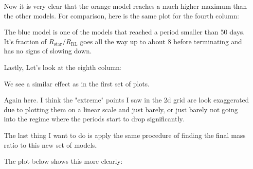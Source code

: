 \documentclass[a4paper,10pt]{article}
\begin{document}
Now it is very clear that the orange model reaches a much higher maximum than the other models. For comparison, here is the same plot for the fourth column:

\begin{figure}[ht]
    \centering
\end{figure}

The blue model is one of the models that reached a period smaller than 50 days. It's fraction of \(R_\text{star}/R_\text{RL}\) goes all the way up to about 8 before terminating and has no signs of slowing down.

\nextpage
Lastly, Let's look at the eighth column:

\begin{figure}[ht]
    \centering
\end{figure}

We see a similar effect as in the first set of plots.

\begin{figure}[ht]
    \centering
\end{figure}

Again here. I think the "extreme" points I saw in the 2d grid are look exaggerated due to plotting them on a linear scale and just barely, or just barely not going into the regime where the periods start to drop significantly.

The last thing I want to do is apply the same procedure of finding the final mass ratio to this new set of models.

\begin{figure}[ht]
    \centering
\end{figure}

The plot below shows this more clearly:
\begin{figure}[ht]
    \centering
\end{figure}

\begin{figure}[ht]
    \centering
\end{figure}







\end{document}
